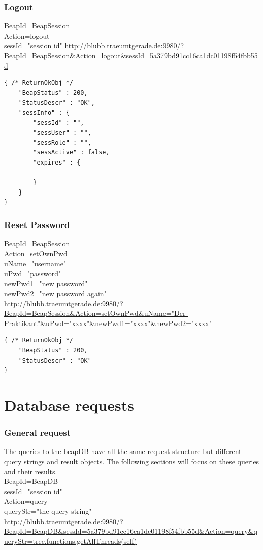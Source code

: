 \documentclass[12pt,a4paper,oneside]{report}
\begin{document}
\subsubsection{Logout}

BeapId=BeapSession\\
Action=logout\\
sessId="session id"
\url{http://blubb.traeumtgerade.de:9980/?BeapId=BeapSession&Action=logout&sessId=5a379bd91cc16ca1dc01198f54fbb55d}
\lstset{language=JavaScript}
\begin{lstlisting}
{ /* ReturnOkObj */
    "BeapStatus" : 200,
    "StatusDescr" : "OK",
    "sessInfo" : { 
        "sessId" : "",
        "sessUser" : "",
        "sessRole" : "",
        "sessActive" : false,
        "expires" : { 

        }
    }
}
\end{lstlisting}

\subsubsection{Reset Password}

BeapId=BeapSession\\
Action=setOwnPwd\\
uName="username"\\
uPwd="password"\\
newPwd1="new password"\\
newPwd2="new password again"\\
\url{http://blubb.traeumtgerade.de:9980/?BeapId=BeapSession&Action=setOwnPwd&uName="Der-Praktikant"&uPwd="xxxx"&newPwd1="xxxx"&newPwd2="xxxx"}
\lstset{language=JavaScript}
\begin{lstlisting}
{ /* ReturnOkObj */
    "BeapStatus" : 200,
    "StatusDescr" : "OK"
}
\end{lstlisting}

\section{Database requests}
\subsubsection{General request}
The queries to the beapDB have all the same request structure but different query strings and result objects. The following sections will focus on these queries and their results.
\\
BeapId=BeapDB\\
sessId="session id"\\
Action=query\\
queryStr="the query string"\\
\url{http://blubb.traeumtgerade.de:9980/?BeapId=BeapDB&sessId=5a379bd91cc16ca1dc01198f54fbb55d&Action=query&queryStr=tree.functions.getAllThreads(self)}
\end{document}
